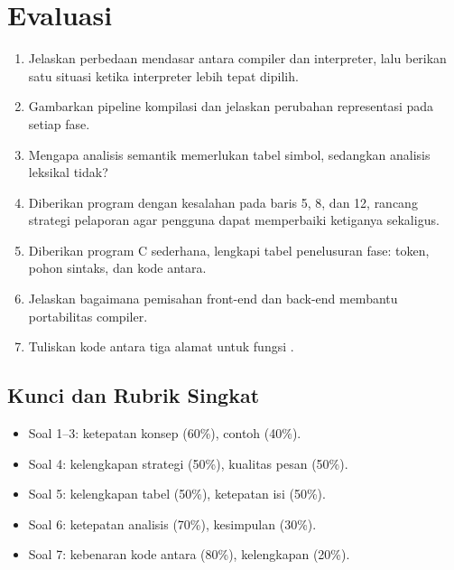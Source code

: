 \section*{Evaluasi}

\begin{enumerate}[label=\arabic*.,leftmargin=*]
  \item Jelaskan perbedaan mendasar antara compiler dan interpreter,
        lalu berikan satu situasi ketika interpreter lebih tepat
        dipilih.
  \item Gambarkan pipeline kompilasi dan jelaskan perubahan
        representasi pada setiap fase.
  \item Mengapa analisis semantik memerlukan tabel simbol, sedangkan
        analisis leksikal tidak?
  \item Diberikan program dengan kesalahan pada baris 5, 8, dan 12,
        rancang strategi pelaporan agar pengguna dapat memperbaiki
        ketiganya sekaligus.
  \item Diberikan program C sederhana, lengkapi tabel penelusuran
        fase: token, pohon sintaks, dan kode antara.
  \item Jelaskan bagaimana pemisahan front-end dan back-end membantu
        portabilitas compiler.
  \item Tuliskan kode antara tiga alamat untuk fungsi
        .
\end{enumerate}

\subsection*{Kunci dan Rubrik Singkat}
\begin{itemize}[leftmargin=*]
  \item Soal 1--3: ketepatan konsep (60\%), contoh (40\%).
  \item Soal 4: kelengkapan strategi (50\%), kualitas pesan (50\%).
  \item Soal 5: kelengkapan tabel (50\%), ketepatan isi (50\%).
  \item Soal 6: ketepatan analisis (70\%), kesimpulan (30\%).
  \item Soal 7: kebenaran kode antara (80\%), kelengkapan (20\%).
\end{itemize}
